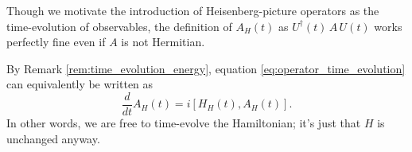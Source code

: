 \begin{remark}
Though we motivate the introduction of Heisenberg-picture operators as the time-evolution of observables, the definition of $A_H(t)$ as $U^\dag(t) \, A \, U(t)$ works perfectly fine even if $A$ is not Hermitian.
\end{remark}

\begin{remark} \label{rem:op_time_ev_H_heisenberg}
By Remark \ref{rem:time_evolution_energy}, equation \ref{eq:operator_time_evolution} can equivalently be written as
\begin{equation}
    \frac{d}{dt} A_H(t) = i \left[H_H(t), A_H(t)\right].
\end{equation}
In other words, we are free to time-evolve the Hamiltonian; it's just that $H$ is unchanged anyway.
\end{remark}

